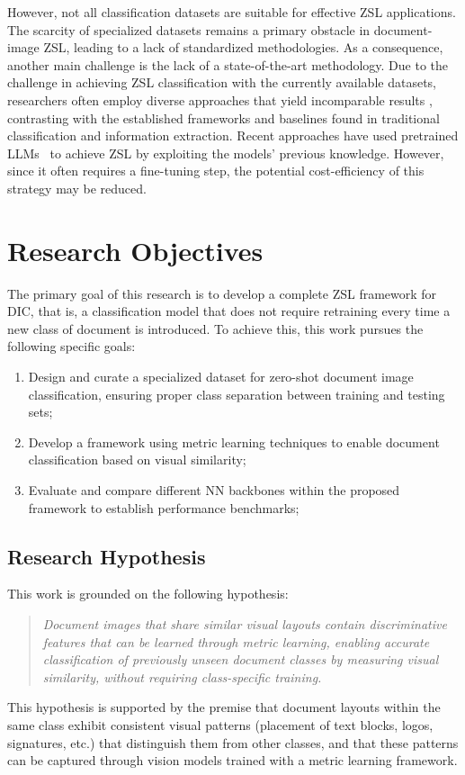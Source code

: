 However, not all classification datasets are suitable for effective \gls{ZSL} applications.
The scarcity of specialized datasets remains a primary obstacle in document-image \gls{ZSL}, leading to a lack of standardized methodologies.
As a consequence, another main challenge is the lack of a state-of-the-art methodology.
Due to the challenge in achieving \gls{ZSL} classification with the currently available datasets, researchers often employ diverse approaches that yield incomparable results \cite{sinha_cica_2024}, contrasting with the established frameworks and baselines found in traditional classification and information extraction.
Recent approaches have used pretrained \glspl{LLM}~\cite{scius-bertrand_zero-shot_2025} to achieve \gls{ZSL} by exploiting the models' previous knowledge. However, since it often requires a fine-tuning step, the potential cost-efficiency of this strategy may be reduced.


\section{Research Objectives}
\label{sec:objectives}

The primary goal of this research is to develop a complete \gls{ZSL} framework for \gls{DIC}, that is, a classification model that does not require retraining every time a new class of document is introduced. To achieve this, this work pursues the following specific goals:
\begin{enumerate}
    \item Design and curate a specialized dataset for zero-shot document image classification, ensuring proper class separation between training and testing sets;
    \item Develop a framework using metric learning techniques to enable document classification based on visual similarity;
    \item Evaluate and compare different \gls{NN} backbones within the proposed framework to establish performance benchmarks;
\end{enumerate}

\subsection{Research Hypothesis}

This work is grounded on the following hypothesis:
\begin{quote}
\textit{Document images that share similar visual layouts contain discriminative features that can be learned through metric learning, enabling accurate classification of previously unseen document classes by measuring visual similarity, without requiring class-specific training.}
\end{quote}
This hypothesis is supported by the premise that document layouts within the same class exhibit consistent visual patterns (placement of text blocks, logos, signatures, etc.) that distinguish them from other classes, and that these patterns can be captured through vision models trained with a metric learning framework.


